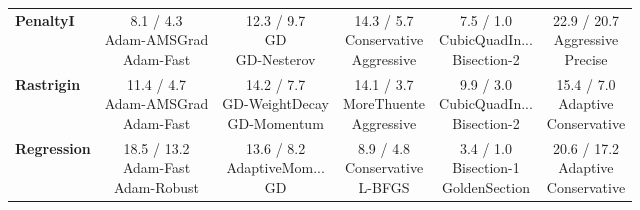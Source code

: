 \documentclass[10pt]{article}
\begin{document}
\begin{longtable}{lccccc}
\textbf{PenaltyI} &  \makecell{8.1 / 4.3 \\ \scriptsize{Adam-AMSGrad} \\ \scriptsize{Adam-Fast}}&  \makecell{12.3 / 9.7 \\ \scriptsize{GD} \\ \scriptsize{GD-Nesterov}}&  \makecell{14.3 / 5.7 \\ \scriptsize{Conservative} \\ \scriptsize{Aggressive}}& \cellcolor{green!20} \makecell{7.5 / 1.0 \\ \scriptsize{CubicQuadIn...} \\ \scriptsize{Bisection-2}}& \cellcolor{red!15} \makecell{22.9 / 20.7 \\ \scriptsize{Aggressive} \\ \scriptsize{Precise}} \\
\textbf{Rastrigin} &  \makecell{11.4 / 4.7 \\ \scriptsize{Adam-AMSGrad} \\ \scriptsize{Adam-Fast}}&  \makecell{14.2 / 7.7 \\ \scriptsize{GD-WeightDecay} \\ \scriptsize{GD-Momentum}}&  \makecell{14.1 / 3.7 \\ \scriptsize{MoreThuente} \\ \scriptsize{Aggressive}}& \cellcolor{green!20} \makecell{9.9 / 3.0 \\ \scriptsize{CubicQuadIn...} \\ \scriptsize{Bisection-2}}& \cellcolor{red!15} \makecell{15.4 / 7.0 \\ \scriptsize{Adaptive} \\ \scriptsize{Conservative}} \\
\textbf{Regression} &  \makecell{18.5 / 13.2 \\ \scriptsize{Adam-Fast} \\ \scriptsize{Adam-Robust}}&  \makecell{13.6 / 8.2 \\ \scriptsize{AdaptiveMom...} \\ \scriptsize{GD}}&  \makecell{8.9 / 4.8 \\ \scriptsize{Conservative} \\ \scriptsize{L-BFGS}}& \cellcolor{green!20} \makecell{3.4 / 1.0 \\ \scriptsize{Bisection-1} \\ \scriptsize{GoldenSection}}& \cellcolor{red!15} \makecell{20.6 / 17.2 \\ \scriptsize{Adaptive} \\ \scriptsize{Conservative}} \\

\end{longtable}
\end{document}
